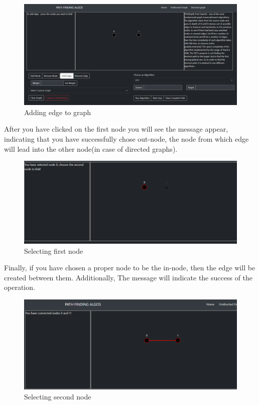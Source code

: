 \begin{figure}[H]
	\centering
	\includegraphics[width=\textwidth]{images/adding_edge.png}
	\caption{Adding edge to graph}
\end{figure}

After you have clicked on the first node you will see the message appear, indicating that you have successfully chose out-node, the node from which edge will lead into the other node(in case of directed graphs).

\begin{figure}[H]
	\centering
	\includegraphics[width=\textwidth]{images/adding_edge_select_first_node.png}
	\caption{Selecting first node}
\end{figure}

Finally, if you have chosen a proper node to be the in-node, then the edge will be created between them. Additionally, The message will indicate the success of the operation.

\begin{figure}[H]
	\centering
	\includegraphics[width=\textwidth]{images/added_edge.png}
	\caption{Selecting second node}
\end{figure}

